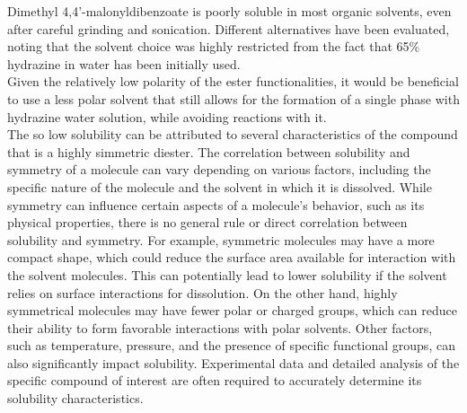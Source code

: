 \documentclass[../Master.tex]{subfiles}
\begin{document}
Dimethyl 4,4’-malonyldibenzoate is poorly soluble in most organic solvents, even after careful grinding and sonication. Different alternatives have been evaluated, noting that the solvent choice was highly restricted from the fact that 65\% hydrazine in water has been initially used. \\
Given the relatively low polarity of the ester functionalities, it would be beneficial to use a less polar solvent that still allows for the formation of a single phase with hydrazine water solution, while avoiding reactions with it.\\
The so low solubility can be attributed to several characteristics of the compound that is a highly simmetric diester. The correlation between solubility and symmetry of a molecule can vary depending on various factors, including the specific nature of the molecule and the solvent in which it is dissolved. While symmetry can influence certain aspects of a molecule's behavior, such as its physical properties, there is no general rule or direct correlation between solubility and symmetry. For example, symmetric molecules may have a more compact shape, which could reduce the surface area available for interaction with the solvent molecules. This can potentially lead to lower solubility if the solvent relies on surface interactions for dissolution. On the other hand, highly symmetrical molecules may have fewer polar or charged groups, which can reduce their ability to form favorable interactions with polar solvents. Other factors, such as temperature, pressure, and the presence of specific functional groups, can also significantly impact solubility. Experimental data and detailed analysis of the specific compound of interest are often required to accurately determine its solubility characteristics.
\end{document}
